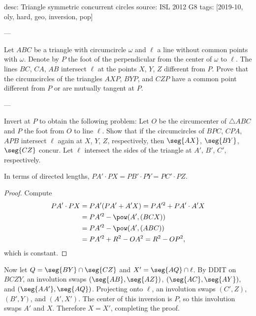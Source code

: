 desc: Triangle symmetric concurrent circles
source: ISL 2012 G8
tags: [2019-10, oly, hard, geo, inversion, pop]

---

Let $ABC$ be a triangle with circumcircle $\omega$ and $\ell$ a line without common points with $\omega$. Denote by $P$ the foot of the perpendicular from the center of $\omega$ to $\ell$. The lines $BC$, $CA$, $AB$ intersect $\ell$ at the points $X$, $Y$, $Z$ different from $P$. Prove that the circumcircles of the triangles $AXP$, $BYP$, and $CZP$ have a common point different from $P$ or are mutually tangent at $P$.

---

Invert at $P$ to obtain the following problem: Let $O$ be the circumcenter of $\triangle ABC$ and $P$ the foot from $O$ to line $\ell$. Show that if the circumcircles of $BPC$, $CPA$, $APB$ intersect $\ell$ again at $X$, $Y$, $Z$, respectively, then $\seg{AX}$, $\seg{BY}$, $\seg{CZ}$ concur. Let $\ell$ intersect the sides of the triangle at $A'$, $B'$, $C'$, respectively.
\begin{iclaim*}
    In terms of directed lengths, $PA'\cdot PX=PB'\cdot PY=PC'\cdot PZ$.
\end{iclaim*}
\begin{proof}
    Compute
    \begin{align*}
        PA'\cdot PX&=PA'(PA'+A'X)
        =PA'^2+PA'\cdot A'X\\
        &=PA'^2-\pow(A',(BCX))\\
        &=PA'^2-\pow(A',(ABC))\\
        &=PA'^2+R^2-OA^2
        =R^2-OP^2,
    \end{align*}
    which is constant.
\end{proof}

Now let $Q=\seg{BY}\cap\seg{CZ}$ and $X'=\seg{AQ}\cap\ell$. By DDIT on $BCZY$, an involution swaps $(\seg{AB},\seg{AZ})$, $(\seg{AC},\seg{AY})$, and $(\seg{AA'},\seg{AQ})$. Projecting onto $\ell$, an involution swaps $(C',Z)$, $(B',Y)$, and $(A',X')$. The center of this inversion is $P$, so this involution swaps $A'$ and $X$. Therefore $X=X'$, completing the proof.
